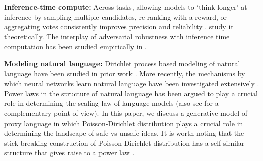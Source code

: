 \documentclass{article}
\theoremstyle{remark} %
\begin{document}
\textbf{Inference-time compute:} Across tasks, allowing models to `think longer' at inference by sampling multiple candidates, re-ranking with a reward, or aggregating votes consistently improves precision and reliability \citep{wang2023selfconsistency, zheng2023judging, brown2024monkeys, levi2024simple, chen2024are, snell2025scaling}. \cite{schaeffer2025largelanguagemonkeyspower, huang2025best, halder2025demystifyingllmasajudgeanalyticallytractable, levi2026learning} study it theoretically. The interplay of adversarial robustness with inference time computation has been studied empirically in \citep{hughes2024best, zaremba2025trading}. 


\textbf{Modeling natural language:} Dirichlet process based modeling of natural language have been studied in prior work \citep{MacKay_Peto_1995, teh2006a, NIPS2006_62f91ce9, liang2007infinite}. More recently, the mechanisms by which neural networks learn natural language have been investigated extensively \citep{arora2015latent, karkada2025closed, korchinski2025emergence, cagnetta2024deep, cagnetta2024towards, parley2026deep, karkada2026symmetry}. Power laws in the structure of natural language has been argued to play a crucial role in determining the scaling law of language models \citep{spigler2020asymptotic,bordelon2020spectrum,bahri2021explaining,michaud2023quantization, cagnetta2026deriving} (also see \cite{barkeshli2026origin,liu2026universal} for a complementary point of view). In this paper, we discuss a generative model of proxy language in which  Poisson-Dirichlet distribution plays a crucial role in determining the landscape of safe-vs-unsafe ideas.  It is worth noting that the stick-breaking construction of Poisson-Dirichlet distribution has a self-similar structure that gives raise to a power law \citep{picard2006combinatorial}.  
\end{document}

